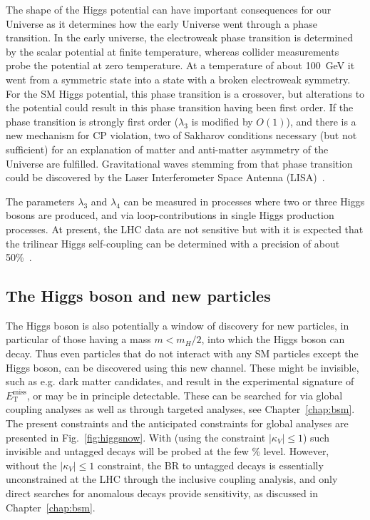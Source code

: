 \documentclass[../report.tex]{subfiles}
\newcommand{\ew}{electroweak\xspace}
\newcommand{\met}{E_\textrm{T}^\textrm{miss}}
\begin{document}
The shape of the Higgs potential can have important consequences for our Universe as it determines how the early Universe went through a phase transition. In the early universe, the \ew phase transition is determined by the scalar potential at finite temperature, whereas collider measurements probe the potential at
zero temperature.
At a temperature of about 100~GeV it went from a symmetric state into a state with a broken \ew symmetry. For the SM Higgs potential, this phase transition is a crossover, but alterations to the potential could result in this phase transition having been first order. 
If the phase transition is strongly first order ($\lambda_3$ is modified by $O(1)$), and there is a new mechanism for CP violation, two of Sakharov conditions necessary (but not sufficient) for an explanation of matter and anti-matter asymmetry of the Universe are fulfilled.
Gravitational waves stemming from that phase transition could be discovered by the Laser Interferometer Space Antenna (LISA)~\cite{Caprini:2015zlo}.  

The parameters $\lambda_3$ and $\lambda_4$ can be measured in processes where two or three Higgs bosons are produced, and via loop-contributions in single Higgs production processes. At present, the LHC data are not sensitive but with \HLLHC it is expected that the trilinear Higgs self-coupling can be determined with a precision of about 50\%~\cite{Cepeda:2019klc}. 

\subsection{The Higgs boson and new particles}
The Higgs boson is also potentially a window of discovery for new particles, in particular of those having a mass $m<m_H/2$, into which the Higgs boson can decay. Thus even particles that do not interact with any SM particles except the Higgs boson, can be discovered using this new channel. These might be invisible, such as e.g. dark matter candidates, and result in the experimental signature of $\met$, or may be in principle detectable. These can be searched for via global coupling analyses as well as through targeted analyses, see Chapter~\ref{chap:bsm}. The present constraints and the anticipated \HLLHC constraints for global analyses are presented in Fig.~\ref{fig:higgsnow}. With \HLLHC (using the constraint $|\kappa_V| \leq 1$) such invisible and untagged decays will be probed at the few \% level. However, without the $|\kappa_V|\leq 1$ constraint, the BR to untagged decays is essentially unconstrained at the LHC through the inclusive coupling analysis, and only direct searches for anomalous decays provide sensitivity, as discussed in Chapter~\ref{chap:bsm}. 
\end{document}
